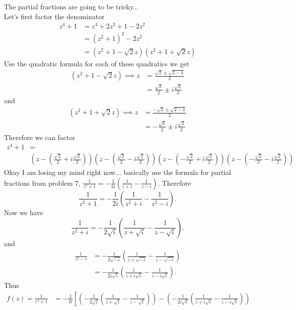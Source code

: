 \documentclass[10pt]{amsart}
\theoremstyle{nonumberplain}
\begin{document}
\begin{enumerate}[label={\bf {\arabic*}:}]
\noindent
The partial fractions are going to be tricky...\\
Let's first factor the denominator
\begin{align*}
z^4 + 1 &= z^4 + 2z^2 + 1 - 2z^2 \\
	&= (z^2 + 1)^2 - 2z^2 \\
	&= (z^2 + 1 - \sqrt{2}z)(z^2 + 1 + \sqrt{2}z)
\end{align*}
Use the quadratic formula for each of these quadratics we get
\begin{align*}
(z^2 + 1 - \sqrt{2}z)
\implies
z &= \frac {\sqrt{2} \pm \sqrt{2 - 4}}{2} \\
	&= \frac {\sqrt{2}}{2} \pm i\frac{\sqrt{2}}{2}
\end{align*}
and
\begin{align*}
(z^2 + 1 + \sqrt{2}z)
\implies
z &= \frac {-\sqrt{2} \pm \sqrt{2 - 4}}{2} \\
	&= -\frac {\sqrt{2}}{2} \pm i\frac{\sqrt{2}}{2}
\end{align*}
Therefore we can factor
\begin{align*}
z^4 + 1 & = \\
	& \left(z - \left(\frac {\sqrt{2}}{2} + i\frac{\sqrt{2}}{2}\right)\right)
	\left( z - \left(\frac {\sqrt{2}}{2} - i\frac{\sqrt{2}}{2}\right)\right)
	\left( z - \left(-\frac {\sqrt{2}}{2} + i\frac{\sqrt{2}}{2}\right)\right)
	\left( z - \left(-\frac {\sqrt{2}}{2} - i\frac{\sqrt{2}}{2}\right)\right)
\end{align*}
Okay I am losing my mind right now...
basically use the formula for partial fractions from problem 7,
$
\frac{1}{z^2 + 1} = -\frac{1}{2i}\left(\frac{1}{z + i} - \frac{1}{z - i}\right).
$
Therefore
$$
\frac{1}{z^4 + 1} = -\frac{1}{2i}\left(\frac{1}{z^2 + i} - \frac{1}{z^2 - i}\right).
$$
Now we have
$$
\frac{1}{z^2 + i} = -\frac{1}{2\sqrt{i}}\left( \frac{1}{z + \sqrt{i}} - \frac{1}{z - \sqrt{i}} \right).
$$
and
\begin{align*}
\frac{1}{z^2 - i} &= -\frac{1}{2\sqrt{-i}}\left( \frac{1}{z + \sqrt{-i}} - \frac{1}{z - \sqrt{-i}} \right) \\
	&= -\frac{1}{2i\sqrt{i}}\left( \frac{1}{z + i\sqrt{i}} - \frac{1}{z - i\sqrt{i}} \right).
\end{align*}
Thus
\begin{align*}
f(z) = \frac{1}{z^4 + 1} &= -\frac{1}{2i}
	\left[
		\left( -\frac{1}{2\sqrt{i}}\left( \frac{1}{z + \sqrt{i}} - \frac{1}{z - \sqrt{i}} \right) \right)
		- \left( -\frac{1}{2i\sqrt{i}}\left( \frac{1}{z + i\sqrt{i}} - \frac{1}{z - i\sqrt{i}} \right) \right)

\end{align*}
\end{enumerate}
\end{document}
